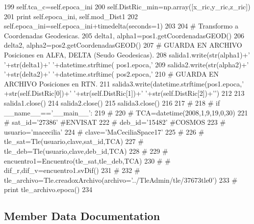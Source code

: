 \begin{DoxyCode}
199                 self.tca_c=self.epoca_ini
200                 self.DistRic_min=np.array([x_ric,y_ric,z_ric])
201             print self.epoca_ini, self.mod_Dist1
202             self.epoca_ini=self.epoca_ini+timedelta(seconds=1)
203             
204             # Transformo a Coordenadas Geodesicas.
205             delta1, alpha1=pos1.getCoordenadasGEOD()
206             delta2, alpha2=pos2.getCoordenadasGEOD()
207             # GUARDA EN ARCHIVO Posiciones en ALFA, DELTA (Seudo Geodesicas).
208             salida1.write(str(alpha1)+' '+str(delta1)+' '+datetime.strftime(
      pos1.epoca,'%
209             salida2.write(str(alpha2)+' '+str(delta2)+' '+datetime.strftime(
      pos2.epoca,'%
210             # GUARDA EN ARCHIVO Posiciones en RTN.
211             salida3.write(datetime.strftime(pos1.epoca,'%
      +str(self.DistRic[0])+' '+str(self.DistRic[1])+' '+str(self.DistRic[2])+'\n')
212 
213         salida1.close()
214         salida2.close()
215         salida3.close()
216 
217 #     
218 # if __name__=='__main__':
219 #      
220 #      TCA=datetime(2008,1,9,19,0,30)
221 #      sat_id='27386' #ENVISAT
222 #      deb_id='15482' #COSMOS
223 #      usuario='macecilia'
224 #      clave='MaCeciliaSpace17'
225 #  
226 #      tle_sat=Tle(usuario,clave,sat_id,TCA)
227 #      tle_deb=Tle(usuario,clave,deb_id,TCA)
228 #      
229 #      encuentro1=Encuentro(tle_sat,tle_deb,TCA)
230 # #     dif_r,dif_v=encuentro1.svDif()
231 #     
232 #     tle_archivo=Tle.creadoxArchivo(archivo='../TleAdmin/tle/37673tle0')
233 #     print tle_archivo.epoca()
234     
    \end{DoxyCode}


\subsection{\-Member \-Data \-Documentation}
\subsubsection[{archivo\-\_\-dif}]{}\label{classpruebas_1_1clase_tle_1_1_encuentro_af72762abc3ab894e7ffc1e5424215eb3}


